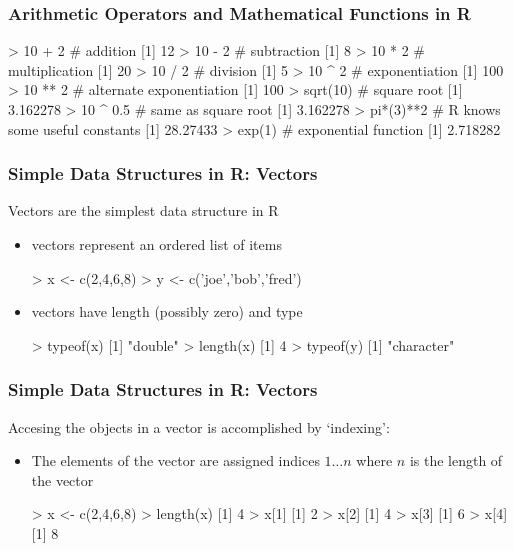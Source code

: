 \documentclass{beamer}
\begin{document}
\begin{frame}[fragile]
  \frametitle{Arithmetic Operators and Mathematical Functions in R}


\begin{Rcode}
> 10 + 2 # addition
[1] 12
> 10 - 2 # subtraction
[1] 8
> 10 * 2 # multiplication
[1] 20
> 10 / 2 # division
[1] 5
> 10 ^ 2 # exponentiation
[1] 100
> 10 ** 2 # alternate exponentiation
[1] 100
> sqrt(10) # square root
[1] 3.162278
> 10 ^ 0.5 # same as square root
[1] 3.162278
> pi*(3)**2  # R knows some useful constants
[1] 28.27433
> exp(1) # exponential function
[1] 2.718282
\end{Rcode}

\end{frame}


\begin{frame}[fragile]
  \frametitle{Simple Data Structures in R: Vectors}

Vectors are the simplest data structure in R
\begin{itemize}
	\item vectors represent an ordered list of items
\begin{Rcode}
> x <- c(2,4,6,8)
> y <- c('joe','bob','fred')
\end{Rcode}

	\item vectors have length (possibly zero) and type
\begin{Rcode}
> typeof(x)
[1] "double"
> length(x)
[1] 4
> typeof(y)
[1] "character"
\end{Rcode}


\end{itemize}

\end{frame}

\begin{frame}[fragile]
  \frametitle{Simple Data Structures in R: Vectors}

Accesing the objects in a vector is accomplished by `indexing':
\begin{itemize}
	\item The elements of the vector are assigned indices $1 \ldots n$ where $n$ is the length of the vector

\begin{Rcode}
> x <- c(2,4,6,8)
> length(x)
[1] 4
> x[1]
[1] 2
> x[2]
[1] 4
> x[3]
[1] 6
> x[4]
[1] 8
\end{Rcode}


\end{itemize}

\end{frame}
\end{document}
